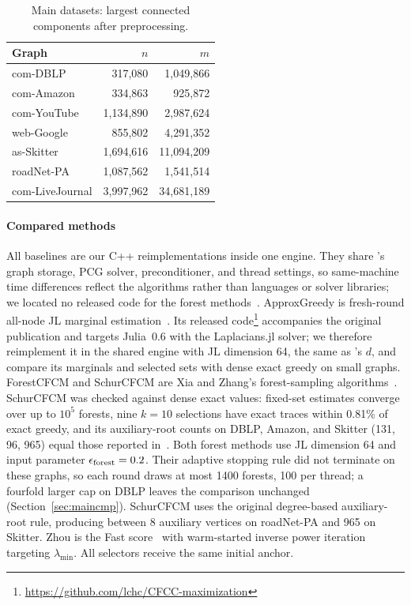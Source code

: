 \begin{table}[t]
\centering\footnotesize
\caption{Main datasets: largest connected components after
preprocessing.}\label{tab:datasets}
\begin{tabular}{@{}lrr@{}}\toprule
Graph & $n$ & $m$\\\midrule
com-DBLP & 317,080 & 1,049,866\\
com-Amazon & 334,863 & 925,872\\
com-YouTube & 1,134,890 & 2,987,624\\
web-Google & 855,802 & 4,291,352\\
as-Skitter & 1,694,616 & 11,094,209\\
roadNet-PA & 1,087,562 & 1,541,514\\
com-LiveJournal & 3,997,962 & 34,681,189\\
\bottomrule\end{tabular}
\end{table}

\paragraph{Compared methods}
All baselines are our C++ reimplementations inside one engine. They
share \alg{}'s graph storage, PCG solver, preconditioner, and thread
settings, so same-machine time differences reflect the algorithms
rather than languages or solver libraries; we located no released code
for the forest methods~\cite{xia2025}.
ApproxGreedy is fresh-round all-node JL marginal
estimation~\cite{li2019}. Its released
code\footnote{\url{https://github.com/lchc/CFCC-maximization}}
accompanies the original publication and targets Julia~0.6 with the
Laplacians.jl solver; we therefore reimplement it in the shared
engine with JL dimension 64, the same as \alg{}'s $d$, and compare
its marginals and selected sets with dense exact greedy on small
graphs. ForestCFCM and
SchurCFCM are Xia and Zhang's forest-sampling
algorithms~\cite{xia2025}. SchurCFCM was checked against dense exact
values: fixed-set estimates converge over up to $10^5$ forests, nine
$k=10$ selections have exact traces within 0.81\% of exact greedy,
and its auxiliary-root counts on DBLP, Amazon, and Skitter (131, 96,
965) equal those reported in~\cite{xia2025}. Both forest methods use
JL dimension 64 and input parameter $\epsilon_{\rm forest}=0.2$.
Their adaptive stopping rule did not terminate on these graphs, so
each round draws at most 1400 forests, 100 per thread; a fourfold
larger cap on DBLP leaves the comparison unchanged
(Section~\ref{sec:maincmp}). SchurCFCM uses the original degree-based
auxiliary-root rule, producing between 8 auxiliary vertices on
roadNet-PA and 965 on Skitter.
Zhou is the Fast score~\cite{zhou2023} with warm-started inverse
power iteration targeting $\lambda_{\min}$.
All selectors receive the same initial anchor.

